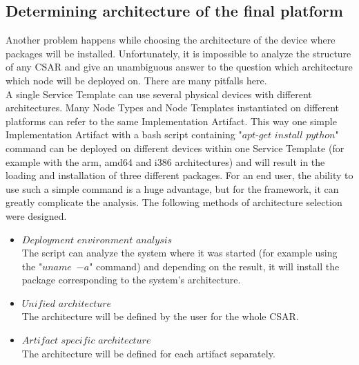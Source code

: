 \subsection{Determining architecture of the final platform}
Another problem happens while choosing the architecture of the device where packages will be installed.
Unfortunately, it is impossible to analyze the structure of any CSAR and give an unambiguous answer to the question which architecture which node will be deployed on.
There are many pitfalls here.\\
A single Service Template can use several physical devices with different architectures.
Many Node Types and Node Templates instantiated on different platforms can refer to the same Implementation Artifact.
This way one simple Implementation Artifact with a bash script containing "$apt$-$get$ $install$ $python$" command can be deployed on different devices within one Service Template (for example with the arm, amd64 and i386 architectures) and will result in the loading and installation of three different packages. 
For an end user, the ability to use such a simple command is a huge advantage, but for the framework, it can greatly complicate the analysis.
The following methods of architecture selection were designed.
\begin{itemize}
	\item $Deployment$ $environment$ $analysis$\\
	The script can analyze the system where it was started (for example using the "$uname$~$-a$" command) and depending on the result, it will install the package corresponding to the system's architecture.
	\item $Unified$ $architecture$\\
	The architecture will be defined by the user for the whole CSAR.
	\item $Artifact$ $specific$ $architecture$\\
	The architecture will be defined for each artifact separately.
\end{itemize}
